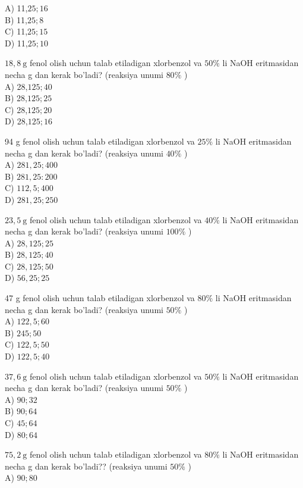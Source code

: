 A) 11,$25 ; 16$\\
B) 11,$25 ; 8$\\
C) 11,$25 ; 15$\\
D) 11,$25 ; 10$
  \item $18,8 \mathrm{~g}$ fenol olish uchun talab etiladigan xlorbenzol va $50 \%$ li NaOH eritmasidan necha g dan kerak bo'ladi? (reaksiya unumi $80 \%$ )\\
A) 28,$125 ; 40$\\
B) 28,$125 ; 25$\\
C) 28,$125 ; 20$\\
D) 28,$125 ; 16$
  \item 94 g fenol olish uchun talab etiladigan xlorbenzol va $25 \%$ li NaOH eritmasidan necha g dan kerak bo'ladi? (reaksiya unumi $40 \%$ )\\
A) $281,25 ; 400$\\
B) $281,25: 200$\\
C) $112,5 ; 400$\\
D) $281,25 ; 250$
  \item $23,5 \mathrm{~g}$ fenol olish uchun talab etiladigan xlorbenzol va $40 \%$ li NaOH eritmasidan necha g dan kerak bo'ladi? (reaksiya unumi $100 \%$ )\\
A) $28,125 ; 25$\\
B) $28,125 ; 40$\\
C) $28,125 ; 50$\\
D) $56,25 ; 25$
  \item 47 g fenol olish uchun talab etiladigan xlorbenzol va $80 \%$ li NaOH eritmasidan necha g dan kerak bo'ladi? (reaksiya unumi $50 \%$ )\\
A) $122,5 ; 60$\\
B) $245 ;  50$\\
C) $122,5 ; 50$\\
D) $122,5 ; 40$
  \item $37,6 \mathrm{~g}$ fenol olish uchun talab etiladigan xlorbenzol va $50 \%$ li NaOH eritmasidan necha g dan kerak bo'ladi? (reaksiya unumi $50 \%$ )\\
A) $90 ; 32$\\
B) $90 ; 64$\\
C) $45 ; 64$\\
D) $80 ; 64$
  \item $75,2 \mathrm{~g}$ fenol olish uchun talab etiladigan xlorbenzol va $80 \%$ li NaOH eritmasidan necha g dan kerak bo'ladi?? (reaksiya unumi $50 \%$ )\\
A) $90 ; 80$\\
